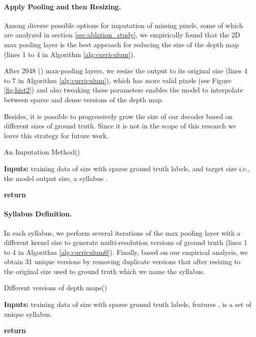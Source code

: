 \documentclass{article}
\begin{document}
\paragraph{Apply Pooling and then Resizing.} Among diverse possible options for imputation of missing pixels, some of which are analyzed in section \ref{sec:ablation_study}, we empirically found that the 2D max pooling layer is the best approach for reducing the size of the depth map (lines 1 to 4 in Algorithm \ref{alg:curriculum}).

After 2048 () max-pooling layers, we resize the output to its original size (lines 4 to 7 in Algorithm \ref{alg:curriculum}), which has more valid pixels (see Figure \ref{fig:hist2}) and also tweaking these parameters enables the model to interpolate between sparse and dense versions of the depth map. 

Besides, it is possible to progressively grow the size of our decoder based on different sizes of ground truth. Since it is not in the scope of this research we leave this strategy for future work. 

\begin{algorithm}[H]
  \caption{An Imputation Method()}\label{alg:curriculum}
\textbf{Inputs:} training data  of size  with sparse ground truth labels, and target size  i.e., the model output size, a syllabus .  
  \begin{algorithmic}[1]
    \For{}
        \State 
    \EndFor
    \State 
    \State \textbf{return} 
    \EndProcedure
  \end{algorithmic}
\end{algorithm}

\paragraph{Syllabus Definition.} In each syllabus, we perform several iterations of the max pooling layer with a different kernel size to generate multi-resolution versions of ground truth (lines 1 to 4 in Algorithm \ref{alg:curriculum0}). Finally, based on our empirical analysis, we obtain 31 unique versions by removing duplicate versions that after resizing to the original size used to ground truth which we name the syllabus. 


\begin{algorithm}[H]
  \caption{Different versions of depth maps()}\label{alg:curriculum0}
\textbf{Inputs:} training data  of size  with sparse ground truth labels, features  ,  is a set of unique syllabus.  
  \begin{algorithmic}[1]
    \For{}
        \State 
        \State 
    \EndFor
    \State \textbf{return} 
    \EndProcedure
  \end{algorithmic}
\end{algorithm}
\end{document}
